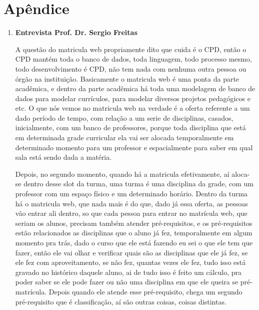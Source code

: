 \chapter*{Apêndice}

\begin{enumerate}
	\item \textbf{Entrevista Prof. Dr. Sergio Freitas}

		A questão do matricula web propriamente dito que cuida é o CPD, então o CPD mantém toda o banco de dados, toda linguagem, todo processo mesmo, todo desenvolvimento é CPD, não tem nada com nenhuma outra pessoa ou órgão na instituição. Basicamente o matricula web é uma ponta da parte acadêmica, e dentro da parte acadêmica há toda uma modelagem de banco de dados para modelar currículos, para modelar diversos projetos pedagógicos e etc. O que nós vemos no matricula web na verdade é a oferta referente a um dado período de tempo, com relação a um serie de disciplinas, casados, inicialmente, com um banco de professores, porque toda disciplina que está em determinada grade curricular ela vai ser alocada temporalmente em determinado momento para um professor e espacialmente para saber em qual sala está sendo dada a matéria.

		Depois, no segundo momento, quando há a matricula efetivamente, aí aloca-se dentro desse slot da turma, uma turma é uma disciplina da grade, com um professor com um espaço físico e um determinado horário. Dentro da turma há o matricula web, que nada mais é do que, dado já essa oferta, as pessoas vão entrar ali dentro, so que cada pessoa para entrar no matrícula web, que seriam os alunos, precisam também atender pré-requisitos, e os pré-requisitos estão relacionados as disciplinas que o aluno já fez, temporalmente em algum momento pra trás, dado o curso que ele está fazendo eu sei o que ele tem que fazer, então ele vai olhar e verificar quais são as disciplinas que ele já fez, se ele fez com aproveitamento, se não fez, quantas vezes ele fez, tudo isso está gravado no histórico daquele aluno, ai de tudo isso é feito um cálculo, pra poder saber se ele pode fazer ou não uma disciplina em que ele queira se pré-matrícula. Depois quando ele atende esse pré-requisito, chega um segundo pré-requisito que é classificação, aí são outras coisas, coisas distintas.


\end{enumerate}
